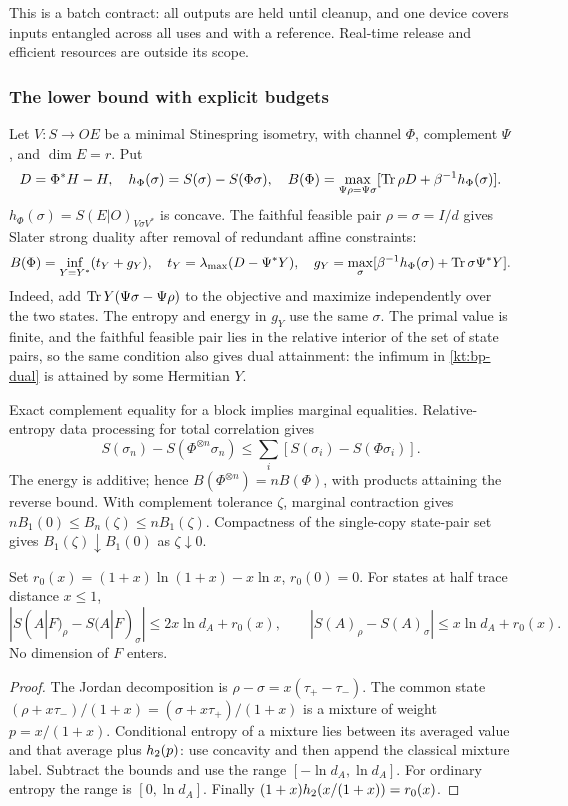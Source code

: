 This is a batch contract: all outputs are held until cleanup, and one device
covers inputs entangled across all uses and with a reference. Real-time
release and efficient resources are outside its scope.

\subsubsection{The lower bound with explicit budgets}
Let $V:S\to OE$ be a minimal Stinespring isometry, with channel $\Phi$,
complement $\Psi$, and $\dim E=r$. Put
\[
 D=\Phi^*H-H,\quad h_\Phi(\sigma)=S(\sigma)-S(\Phi\sigma),\quad
 B(\Phi)=\max_{\Psi\rho=\Psi\sigma}
       [\operatorname{Tr}\rho D+\beta^{-1}h_\Phi(\sigma)].
\]
$h_\Phi(\sigma)=S(E|O)_{V\sigma V^*}$ is concave. The faithful feasible
pair $\rho=\sigma=I/d$ gives Slater strong duality after removal of
redundant affine constraints:
\begin{equation}\label{kt:bp-dual}
 B(\Phi)=\inf_{Y=Y^*}(t_Y+g_Y),\quad
 t_Y=\lambda_{\max}(D-\Psi^*Y),\quad
 g_Y=\max_\sigma[\beta^{-1}h_\Phi(\sigma)+\operatorname{Tr}\sigma\Psi^*Y].
\end{equation}
Indeed, add $\operatorname{Tr} Y(\Psi\sigma-\Psi\rho)$ to the objective and maximize
independently over the two states. The entropy and energy in $g_Y$
use the same $\sigma$. The primal value is finite, and the faithful
feasible pair lies in the relative interior of the set of state pairs,
so the same condition also gives dual attainment: the infimum in
\eqref{kt:bp-dual} is attained by some Hermitian $Y$.

Exact complement equality for a block implies marginal equalities.
Relative-entropy data processing for total correlation gives
\[
 S(\sigma_n)-S(\Phi^{\otimes n}\sigma_n)
 \le\sum_i[S(\sigma_i)-S(\Phi\sigma_i)].
\]
The energy is additive; hence $B(\Phi^{\otimes n})=nB(\Phi)$, with
products attaining the reverse bound. With complement tolerance $\zeta$,
marginal contraction gives $nB_1(0)\le B_n(\zeta)\le nB_1(\zeta)$.
Compactness of the single-copy state-pair set gives
$B_1(\zeta)\downarrow B_1(0)$ as $\zeta\downarrow0$.


\begin{lemma}\label{kt:bp-continuity}
Set $r_0(x)=(1+x)\ln(1+x)-x\ln x$, $r_0(0)=0$.
For states at half trace distance $x\le1$,
\[
 |S(A|F)_\rho-S(A|F)_\sigma|\le2x\ln d_A+r_0(x),\qquad
 |S(A)_\rho-S(A)_\sigma|\le x\ln d_A+r_0(x).
\]
No dimension of $F$ enters.
\end{lemma}
\begin{proof}
The Jordan decomposition is $\rho-\sigma=x(\tau_+-\tau_-)$.
The common state $(\rho+x\tau_-)/(1+x)=(\sigma+x\tau_+)/(1+x)$ is a
mixture of weight $p=x/(1+x)$. Conditional entropy of a mixture lies
between its averaged value and that average plus $h_2(p)$: use concavity
and then append the classical mixture label. Subtract the bounds and
use the range $[-\ln d_A,\ln d_A]$. For ordinary entropy the range is
$[0,\ln d_A]$. Finally $(1+x)h_2(x/(1+x))=r_0(x)$.
\end{proof}

